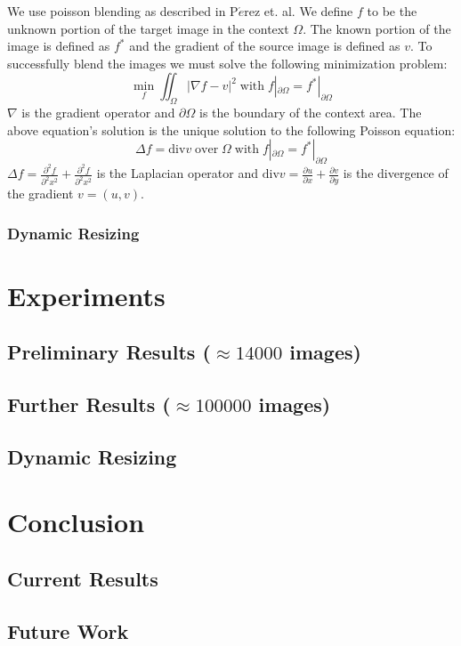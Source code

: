\documentclass[11pt]{amsart}
\begin{document}
We use poisson blending as described in P$\acute{e}$rez et. al. \cite{Perez:2003} We define $f$ to be the unknown portion of the target image in the context $\Omega$. The known portion of the image is defined as $f^\ast$ and the gradient of the source image is defined as $v$. To successfully blend the images we must solve the following minimization problem:
$$ \min_f \iint_\Omega|\nabla f-v|^{2} \;\mathrm{with}\; f|_{\partial\Omega} = f^{\ast}|_{\partial\Omega} $$
$\nabla$ is the gradient operator and $\partial\Omega$ is the boundary of the context area. The above equation's solution is the unique solution to the following Poisson equation:
$$\Delta f=\mathrm{div} v\;\mathrm{ over }\;\Omega\;\mathrm{  with}\;  f|_{\partial\Omega} = f^{\ast}|_{\partial\Omega}$$
$\Delta f = \frac{\partial^{2} f}{\partial^{2}x^2}+\frac{\partial^{2}f}{\partial^{2}x^2}$ is the Laplacian operator and $\mathrm{div} v = \frac{\partial u}{\partial x}+\frac{\partial v}{\partial y}$ is the divergence of the gradient $v=(u,v)$.

\subsubsection{Dynamic Resizing}

\section{Experiments}

\subsection{Preliminary Results ($\approx14000$ images)}

\subsection{Further Results ($\approx100000$ images)} 

\subsection{Dynamic Resizing}

\section{Conclusion}

\subsection{Current Results}

\subsection{Future Work}



\end{document}
